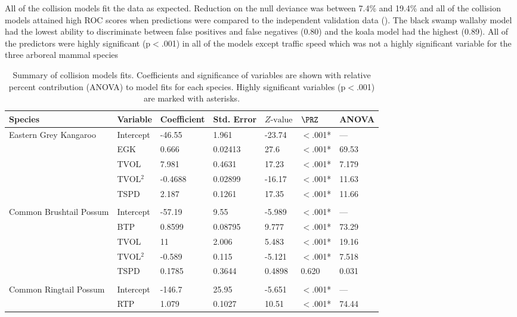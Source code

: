 All of the collision models fit the data as expected.  Reduction on the null deviance was between 7.4\% and 19.4\% and all of the collision models attained high ROC scores when predictions were compared to the independent validation data ().  The black swamp wallaby model had the lowest ability to discriminate between false positives and false negatives (0.80) and the koala model had the highest (0.89). All of the predictors were highly significant (p$<$.001) in all of the models except traffic speed which was not a highly significant variable for the three arboreal mammal species

\begin{table}[htp]
\caption[Summary of collision models for six mammal species]{Summary of collision models fits. Coefficients and significance of variables are shown with relative percent contribution (ANOVA) to model fits for each species.  Highly significant variables (p$<$.001) are marked with asterisks.}
\centering
\begin{tabularx}{0.9\textwidth}{lllllll} \toprule
Species & Variable & Coefficient & Std. Error & $Z\text{-value}$ & $\PRZ$ & ANOVA \\ 
\midrule
Eastern Grey Kangaroo & Intercept & -46.55 & 1.961 & -23.74 & $<$.001* & --- \\ 
   & EGK & 0.666 & 0.02413 & 27.6 & $<$.001* & 69.53 \\ 
   & TVOL & 7.981 & 0.4631 & 17.23 & $<$.001* & 7.179 \\ 
   & TVOL$^2$ & -0.4688 & 0.02899 & -16.17 & $<$.001* & 11.63 \\ 
   & TSPD & 2.187 & 0.1261 & 17.35 & $<$.001* & 11.66 \\ 
   &  &  &  &  &  &  \\ 
Common Brushtail Possum & Intercept & -57.19 & 9.55 & -5.989 & $<$.001* & --- \\ 
   & BTP & 0.8599 & 0.08795 & 9.777 & $<$.001* & 73.29 \\ 
   & TVOL & 11 & 2.006 & 5.483 & $<$.001* & 19.16 \\ 
   & TVOL$^2$ & -0.589 & 0.115 & -5.121 & $<$.001* & 7.518 \\ 
   & TSPD & 0.1785 & 0.3644 & 0.4898 & 0.620 & 0.031 \\ 
   &  &  &  &  &  &  \\ 
Common Ringtail Possum & Intercept & -146.7 & 25.95 & -5.651 & $<$.001* & --- \\ 
   & RTP & 1.079 & 0.1027 & 10.51 & $<$.001* & 74.44 \\ 

\end{tabularx}
\end{table}
